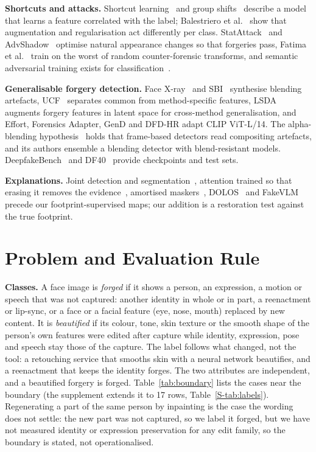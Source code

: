 \documentclass[conference]{IEEEtran}
\begin{document}
\textbf{Shortcuts and attacks.} Shortcut learning~\cite{geirhos2020} and group shifts~\cite{sagawa2020} describe a model that
learns a feature correlated with the label; Balestriero et al.~\cite{balestriero2022} show that augmentation and regularisation
act differently per class. StatAttack~\cite{statattack2023} and AdvShadow~\cite{advshadow2024} optimise natural appearance
changes so that forgeries pass, Fatima et al.~\cite{fatima2025} train on the worst of random counter-forensic transforms, and
semantic adversarial training exists for classification~\cite{hosseini2018,laidlaw2019,gat2023,ava2021}.

\textbf{Generalisable forgery detection.} Face X-ray~\cite{facexray} and SBI~\cite{sbi} synthesise blending artefacts,
UCF~\cite{ucf} separates common from method-specific features, LSDA~\cite{lsda} augments forgery features in latent space for
cross-method generalisation, and Effort, Forensics Adapter, GenD and DFD-HR adapt CLIP ViT-L/14. The alpha-blending
hypothesis~\cite{alphablend2026} holds that frame-based detectors read compositing artefacts, and its authors ensemble a
blending detector with blend-resistant models. DeepfakeBench~\cite{deepfakebench} and DF40~\cite{df40} provide checkpoints and
test sets.

\textbf{Explanations.} Joint detection and segmentation~\cite{nguyen2019multitask,hifinet2023}, attention trained so that
erasing it removes the evidence~\cite{gain}, amortised maskers~\cite{dabkowski2017,phang2020}, DOLOS~\cite{dolos} and
FakeVLM~\cite{fakevlm2025} precede our footprint-supervised maps; our addition is a restoration test against the true footprint.

\section{Problem and Evaluation Rule}
\label{sec:protocol}
\textbf{Classes.} A face image is \emph{forged} if it shows a person, an expression, a motion or speech that was not captured:
another identity in whole or in part, a reenactment or lip-sync, or a face or a facial feature (eye, nose, mouth) replaced by
new content. It
is \emph{beautified} if its colour, tone, skin texture or the smooth shape of the person's own features were edited after
capture while identity, expression, pose and speech stay those of the capture. The label follows what changed, not the tool: a
retouching service that smooths skin with a neural network beautifies, and a reenactment that keeps the identity forges. The
two attributes are independent, and a beautified forgery is forged. Table~\ref{tab:boundary} lists the cases near the boundary
(the supplement extends it to 17 rows, Table~\ref{S-tab:labels}). Regenerating a part of the same person by inpainting is the
case the wording does not settle: the new part was not captured, so we label it forged, but we have not measured identity or
expression preservation for any edit family, so the boundary is stated, not operationalised.
\end{document}
